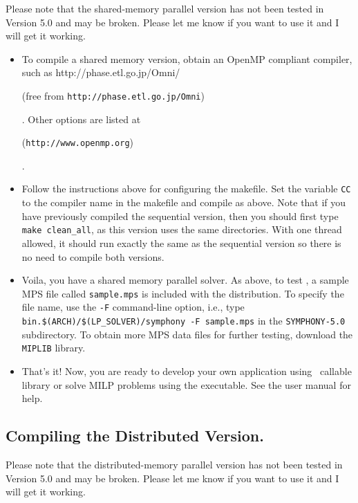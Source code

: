 Please note that the shared-memory parallel version has not been tested in
Version 5.0 and may be broken. Please let me know if you want to use it and I
will get it working. 

\begin{itemize}
        \item To compile a shared memory version, obtain an OpenMP
        compliant compiler, such as 
        {http://phase.etl.go.jp/Omni/}
\begin{latexonly} 
        (free from {\tt http://phase.etl.go.jp/Omni})
\end{latexonly}. 
        Other options are listed at 
\begin{latexonly}
        ({\tt http://www.openmp.org})
\end{latexonly}.

        \item Follow the instructions above for configuring the makefile. Set
the variable {\tt CC} to the compiler name in the makefile and compile as
above. Note that if you have previously compiled the sequential version, then
you should first type {\tt  make clean\_all}, as this version uses the same
directories.  With one thread allowed, it should run exactly the same as the
sequential version so there is no need to compile both versions.

        \item Voila, you have a shared memory parallel solver. As above, to
test \BB, a sample MPS file called \texttt{sample.mps} is included with 
the distribution. To specify the file name, use the \texttt{-F} command-line 
option, i.e., type \texttt{bin.\$(ARCH)/\$(LP\_SOLVER)/symphony -F sample.mps}
in the \texttt{SYMPHONY-5.0} subdirectory. To obtain more MPS data files for 
further testing, download the \texttt{MIPLIB} library.

\item That's it! Now, you are ready to develop your own application using 
\BB\ callable library or solve MILP problems using the executable. See the
user manual for help.

\end{itemize}

\subsection{Compiling the Distributed Version.}

Please note that the distributed-memory parallel version has not been tested
in Version 5.0 and may be broken. Please let me know if you want to use it and
I will get it working.

